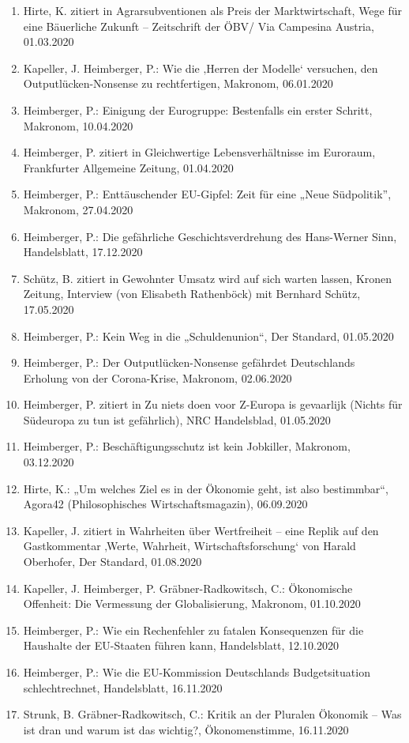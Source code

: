 \begin{enumerate}
	 \item Hirte, K. zitiert in Agrarsubventionen als Preis der Marktwirtschaft, Wege für eine Bäuerliche Zukunft – Zeitschrift der ÖBV/ Via Campesina Austria, 01.03.2020
	 \item Kapeller, J. Heimberger, P.: Wie die ‚Herren der Modelle‘ versuchen, den Outputlücken-Nonsense zu rechtfertigen, Makronom, 06.01.2020
	 \item Heimberger, P.: Einigung der Eurogruppe: Bestenfalls ein erster Schritt, Makronom, 10.04.2020
	 \item Heimberger, P. zitiert in Gleichwertige Lebensverhältnisse im Euroraum, Frankfurter Allgemeine Zeitung, 01.04.2020
	 \item Heimberger, P.: Enttäuschender EU-Gipfel: Zeit für eine „Neue Südpolitik”, Makronom, 27.04.2020
	 \item Heimberger, P.: Die gefährliche Geschichtsverdrehung des Hans-Werner Sinn, Handelsblatt, 17.12.2020
	 \item Schütz, B. zitiert in Gewohnter Umsatz wird auf sich warten lassen, Kronen Zeitung, Interview (von Elisabeth Rathenböck) mit Bernhard Schütz, 17.05.2020
	 \item Heimberger, P.: Kein Weg in die „Schuldenunion“, Der Standard, 01.05.2020
	 \item Heimberger, P.: Der Outputlücken-Nonsense gefährdet Deutschlands Erholung von der Corona-Krise, Makronom, 02.06.2020
	 \item Heimberger, P. zitiert in Zu niets doen voor Z-Europa is gevaarlijk (Nichts für Südeuropa zu tun ist gefährlich), NRC Handelsblad, 01.05.2020
	 \item Heimberger, P.: Beschäftigungsschutz ist kein Jobkiller, Makronom, 03.12.2020
	 \item Hirte, K.: „Um welches Ziel es in der Ökonomie geht, ist also bestimmbar“, Agora42 (Philosophisches Wirtschaftsmagazin), 06.09.2020
	 \item Kapeller, J. zitiert in Wahrheiten über Wertfreiheit – eine Replik auf den Gastkommentar ‚Werte, Wahrheit, Wirtschaftsforschung‘ von Harald Oberhofer, Der Standard, 01.08.2020
	 \item Kapeller, J. Heimberger, P. Gräbner-Radkowitsch, C.: Ökonomische Offenheit: Die Vermessung der Globalisierung, Makronom, 01.10.2020
	 \item Heimberger, P.: Wie ein Rechenfehler zu fatalen Konsequenzen für die Haushalte der EU-Staaten führen kann, Handelsblatt, 12.10.2020
	 \item Heimberger, P.: Wie die EU-Kommission Deutschlands Budgetsituation schlechtrechnet, Handelsblatt, 16.11.2020
	 \item Strunk, B. Gräbner-Radkowitsch, C.: Kritik an der Pluralen Ökonomik – Was ist dran und warum ist das wichtig?, Ökonomenstimme, 16.11.2020
\end{enumerate}
